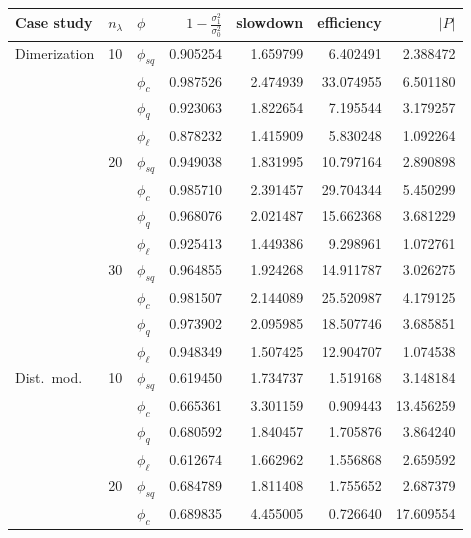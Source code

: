 \begin{table}[]
    \centering
\begin{tabular}{l@{\hskip 12pt}l@{\hskip 12pt}l@{\hskip 12pt}r@{\hskip 12pt}r@{\hskip 12pt}r@{\hskip 12pt}r}
\toprule
  Case study &   $n_{\lambda}$ & $\phi$ & $1-\frac{\sigma_1^2}{\sigma_0^2}$ &  slowdown &  efficiency &$\lvert P\rvert$ \\\midrule
Dimerization & 10 &$\phi_{sq}$ &  0.905254 &  1.659799 &    6.402491 &   2.388472 \\
            &    &$\phi_{c}$ &  0.987526 &  2.474939 &   33.074955 &   6.501180 \\
            &    &$\phi_{q}$ &  0.923063 &  1.822654 &    7.195544 &   3.179257 \\
            &    & $\phi_{\ell}$ &  0.878232 &  1.415909 &    5.830248 &   1.092264 \\\cmidrule{2-7}
            & 20 &$\phi_{sq}$ &  0.949038 &  1.831995 &   10.797164 &   2.890898 \\
            &    &$\phi_{c}$ &  0.985710 &  2.391457 &   29.704344 &   5.450299 \\
            &    &$\phi_{q}$ &  0.968076 &  2.021487 &   15.662368 &   3.681229 \\
            &    & $\phi_{\ell}$ &  0.925413 &  1.449386 &    9.298961 &   1.072761 \\\cmidrule{2-7}
            & 30 &$\phi_{sq}$ &  0.964855 &  1.924268 &   14.911787 &   3.026275 \\
            &    &$\phi_{c}$ &  0.981507 &  2.144089 &   25.520987 &   4.179125 \\
            &    &$\phi_{q}$ &  0.973902 &  2.095985 &   18.507746 &   3.685851 \\
            &    & $\phi_{\ell}$ &  0.948349 &  1.507425 &   12.904707 &   1.074538 \\\midrule
Dist.\ mod. & 10 &$\phi_{sq}$ &  0.619450 &  1.734737 &    1.519168 &   3.148184 \\
            &    &$\phi_{c}$ &  0.665361 &  3.301159 &    0.909443 &  13.456259 \\
            &    &$\phi_{q}$ &  0.680592 &  1.840457 &    1.705876 &   3.864240 \\
            &    &$\phi_{\ell}$ &  0.612674 &  1.662962 &    1.556868 &   2.659592 \\\cmidrule{2-7}
            & 20 &$\phi_{sq}$ &  0.684789 &  1.811408 &    1.755652 &   2.687379 \\
            &    &$\phi_{c}$ &  0.689835 &  4.455005 &    0.726640 &  17.609554 \\

\end{tabular}
\end{table}
